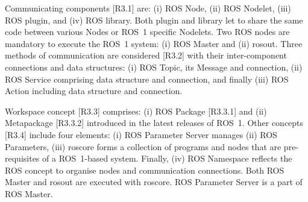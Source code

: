 \documentclass[11pt,oneside,a4paper]{article}
\begin{document}
	Communicating components [R3.1] are: (i) ROS Node, (ii) ROS Nodelet, (iii) ROS plugin, and (iv) ROS library. Both plugin and library let to share the same code between various Nodes or ROS~1 specific Nodelets. Two ROS nodes are mandatory to execute the ROS~1 system: (i) ROS Master and (ii) rosout.
%
	 Three methods of communication are considered [R3.2] with their inter-component connections and data structures: (i) ROS Topic, its Message and connection, (ii) ROS Service comprising data structure and connection, and finally (iii) ROS Action including data structure and connection.
	
	Workspace concept [R3.3] comprises: (i) ROS Package [R3.3.1] and (ii) Metapackage [R3.3.2] introduced in the latest releases of ROS~1.
%	
	Other concepts [R3.4] include four elements: (i) ROS Parameter Server manages (ii) ROS Parameters, (iii) roscore forms a collection of programs and nodes that are pre-requisites of a ROS~1-based system. Finally, (iv) ROS Namespace reflects the ROS concept to organise nodes and communication connections. Both ROS Master and rosout are executed with roscore. ROS Parameter Server is a part of ROS Master.
%	
\end{document}
